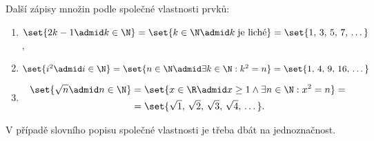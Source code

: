 \begin{example} Další zápisy množin podle společné vlastnosti prvků:
    \begin{enumerate}[label=(\roman*)]
        \item $\set{2k-1 \admid k \in \N}=\set{k\in\N \admid k\;\text{je liché}}=\set{1,\,3,\,5,\,7,\,\dots}$ ,
        \item $\set{i^2 \admid i \in \N}=\set{n \in \N \admid \exists k\in\N: k^2=n}=\set{1,\,4,\,9,\,16,\,\dots}$
        \item 
        \begin{align*}
            \set{\sqrt{n} \admid n \in \N}&=\set{x \in \R \admid x \geq 1 \land \exists n\in\N: x^2=n}=\\
            &=\set{\sqrt{1},\,\sqrt{2},\,\sqrt{3},\,\sqrt{4},\,\dots}.
        \end{align*}
    \end{enumerate}
\end{example}
\begin{remark}
    V případě slovního popisu společné vlastnosti je třeba dbát na jednoznačnost.
\end{remark}

